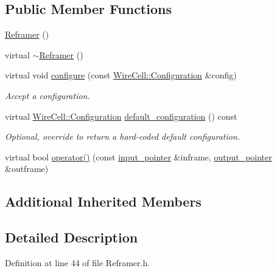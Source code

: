\subsection*{Public Member Functions}
\begin{DoxyCompactItemize}
\item 
\hyperlink{class_wire_cell_1_1_gen_1_1_reframer_a90b4279f9f358f9193f8f64842f1b05c}{Reframer} ()
\item 
virtual \hyperlink{class_wire_cell_1_1_gen_1_1_reframer_a26d6312e0176987a5f6e4461285e5c72}{$\sim$\+Reframer} ()
\item 
virtual void \hyperlink{class_wire_cell_1_1_gen_1_1_reframer_a805ac9a1be8a7b23c2ac5dc6334aea7f}{configure} (const \hyperlink{namespace_wire_cell_a9f705541fc1d46c608b3d32c182333ee}{Wire\+Cell\+::\+Configuration} \&config)
\begin{DoxyCompactList}\small\item\em Accept a configuration. \end{DoxyCompactList}\item 
virtual \hyperlink{namespace_wire_cell_a9f705541fc1d46c608b3d32c182333ee}{Wire\+Cell\+::\+Configuration} \hyperlink{class_wire_cell_1_1_gen_1_1_reframer_ad7d66a100026793f7ba7f284baff298f}{default\+\_\+configuration} () const
\begin{DoxyCompactList}\small\item\em Optional, override to return a hard-\/coded default configuration. \end{DoxyCompactList}\item 
virtual bool \hyperlink{class_wire_cell_1_1_gen_1_1_reframer_a134c00c1b1e270f74a90729a5b3219d5}{operator()} (const \hyperlink{class_wire_cell_1_1_i_function_node_a55c0946156df9b712b8ad1a0b59b2db6}{input\+\_\+pointer} \&inframe, \hyperlink{class_wire_cell_1_1_i_function_node_afc02f1ec60d31aacddf64963f9ca650b}{output\+\_\+pointer} \&outframe)
\end{DoxyCompactItemize}
\subsection*{Additional Inherited Members}


\subsection{Detailed Description}


Definition at line 44 of file Reframer.\+h.



